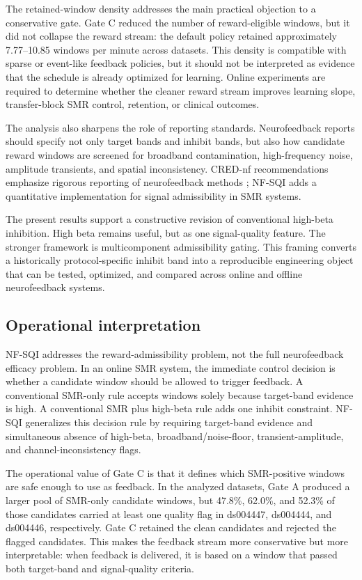 \documentclass[preprint,12pt]{elsarticle}
\begin{document}
The retained-window density addresses the main practical objection to a conservative gate. Gate C reduced the number of reward-eligible windows, but it did not collapse the reward stream: the default policy retained approximately 7.77--10.85 windows per minute across datasets. This density is compatible with sparse or event-like feedback policies, but it should not be interpreted as evidence that the schedule is already optimized for learning. Online experiments are required to determine whether the cleaner reward stream improves learning slope, transfer-block SMR control, retention, or clinical outcomes.

The analysis also sharpens the role of reporting standards. Neurofeedback reports should specify not only target bands and inhibit bands, but also how candidate reward windows are screened for broadband contamination, high-frequency noise, amplitude transients, and spatial inconsistency. CRED-nf recommendations emphasize rigorous reporting of neurofeedback methods \citep{Ros2020CRED}; NF-SQI adds a quantitative implementation for signal admissibility in SMR systems.

The present results support a constructive revision of conventional high-beta inhibition. High beta remains useful, but as one signal-quality feature. The stronger framework is multicomponent admissibility gating. This framing converts a historically protocol-specific inhibit band into a reproducible engineering object that can be tested, optimized, and compared across online and offline neurofeedback systems.

\subsection{Operational interpretation}

NF-SQI addresses the reward-admissibility problem, not the full neurofeedback efficacy problem. In an online SMR system, the immediate control decision is whether a candidate window should be allowed to trigger feedback. A conventional SMR-only rule accepts windows solely because target-band evidence is high. A conventional SMR plus high-beta rule adds one inhibit constraint. NF-SQI generalizes this decision rule by requiring target-band evidence and simultaneous absence of high-beta, broadband/noise-floor, transient-amplitude, and channel-inconsistency flags.

The operational value of Gate C is that it defines which SMR-positive windows are safe enough to use as feedback. In the analyzed datasets, Gate A produced a larger pool of SMR-only candidate windows, but 47.8\%, 62.0\%, and 52.3\% of those candidates carried at least one quality flag in ds004447, ds004444, and ds004446, respectively. Gate C retained the clean candidates and rejected the flagged candidates. This makes the feedback stream more conservative but more interpretable: when feedback is delivered, it is based on a window that passed both target-band and signal-quality criteria.
\end{document}

